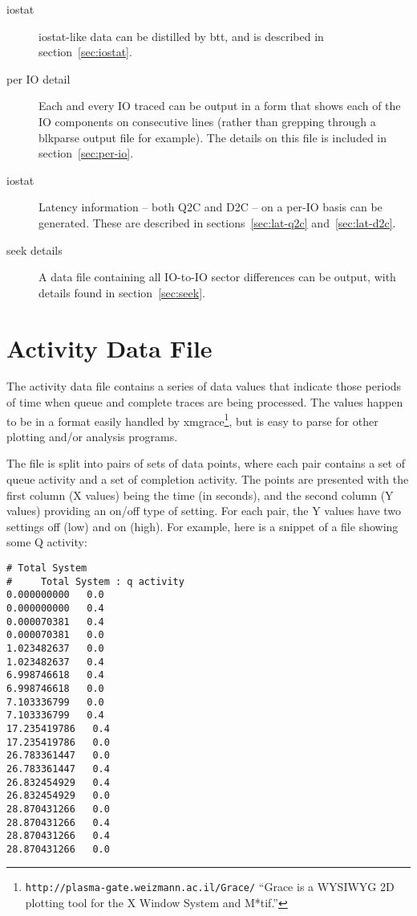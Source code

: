 \documentclass{article}
\begin{document}
  \begin{description}
    \item[iostat] iostat-like data can be distilled by btt, and is
    described in section~\ref{sec:iostat}.

    \item[per IO detail] Each and every IO traced can be output in a form
    that shows each of the IO components on consecutive lines (rather
    than grepping through a blkparse output file for example). The
    details on this file is included in section~\ref{sec:per-io}.

    \item[iostat] Latency information -- both Q2C and D2C --
    on a per-IO basis can be generated. These are described in
    sections~\ref{sec:lat-q2c} and~\ref{sec:lat-d2c}.

    \item[seek details] A data file containing all IO-to-IO
    sector differences can be output, with details found in
    section~\ref{sec:seek}.
  \end{description}

\newpage\section{\label{sec:activity}Activity Data File}

  The activity data file contains a series of data values that indicate
  those periods of time when queue and complete traces are being
  processed.  The values happen to be in a format easily handled by
  xmgrace\footnote{\texttt{http://plasma-gate.weizmann.ac.il/Grace/}
  ``Grace is a WYSIWYG 2D plotting tool for the X Window System and
  M*tif.''}, but is easy to parse for other plotting and/or analysis
  programs.

  The file is split into pairs of sets of data points, where each pair
  contains a set of queue activity and a set of completion activity. The
  points are presented with the first column (X values) being the time
  (in seconds), and the second column (Y values) providing an on/off
  type of setting. For each pair, the Y values have two settings off
  (low) and on (high). For example, here is a snippet of a file showing
  some Q activity:

\begin{verbatim}
# Total System
#     Total System : q activity
0.000000000   0.0
0.000000000   0.4
0.000070381   0.4
0.000070381   0.0
1.023482637   0.0
1.023482637   0.4
6.998746618   0.4
6.998746618   0.0
7.103336799   0.0
7.103336799   0.4
17.235419786   0.4
17.235419786   0.0
26.783361447   0.0
26.783361447   0.4
26.832454929   0.4
26.832454929   0.0
28.870431266   0.0
28.870431266   0.4
28.870431266   0.4
28.870431266   0.0
\end{verbatim}
\end{document}

